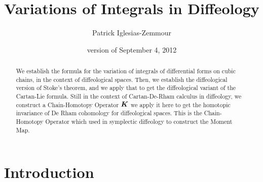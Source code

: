 \documentclass[11pt,reqno]{amsart}
\theoremstyle{definition}
\newcommand{\eK}{\mbox{\boldmath $K$}}
\begin{document}
	
	
	\title{Variations of Integrals in Diffeology}
	
	\author{Patrick Iglesias-Zemmour}
	
	
	\address{LATP-CNRS, 39 rue F. Joliot-Curie, 13453 Marseille Cedex 13, France}
	
	\date{version of September 4, 2012}
	


	
	\begin{abstract}
    We establish the formula for the variation of
    integrals of differential forms on cubic chains, in the
    context of diffeological spaces. Then, we establish the diffeological version of Stoke's
    theorem, and we apply that to get the diffeological variant of the
    Cartan-Lie formula. Still in the context of Cartan-De-Rham calculus
    in diffeology, we
    construct a Chain-Homotopy Operator $\eK$ we apply it here to
    get  the homotopic invariance of De Rham cohomology for
    diffeological spaces. This is the Chain-Homotopy Operator which used in
    symplectic diffeology to construct the Moment Map. 
	\end{abstract}
	
	\maketitle
	
  
	\section*{Introduction}
\end{document}
